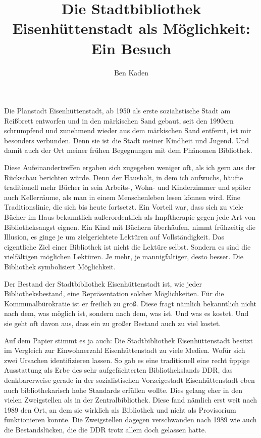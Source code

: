 \documentclass[a4paper,
fontsize=11pt,
oneside,
numbers=noperiodatend,
parskip=half-,
bibliography=totoc,
final
]{scrartcl}
\title{\LARGE{Die Stadtbibliothek Eisenhüttenstadt als Möglichkeit: Ein Besuch}} %
\author{Ben Kaden} %
\date{}
\begin{document}
\maketitle
\thispagestyle{fancyplain} 


Die Planstadt Eisenhüttenstadt, ab 1950 als erste sozialistische Stadt
am Reißbrett entworfen und in den märkischen Sand gebaut, seit den
1990ern schrumpfend und zunehmend wieder aus dem märkischen Sand
entfernt, ist mir besonders verbunden. Denn sie ist die Stadt meiner
Kindheit und Jugend. Und damit auch der Ort meiner frühen Begegnungen
mit dem Phänomen Bibliothek.

Diese Aufeinandertreffen ergaben sich zugegeben weniger oft, als ich
gern aus der Rückschau berichten würde. Denn der Haushalt, in dem ich
aufwuchs, häufte traditionell mehr Bücher in sein Arbeits-, Wohn- und
Kinderzimmer und später auch Kellerräume, als man in einem Menschenleben
lesen können wird. Eine Traditionslinie, die sich bis heute fortsetzt.
Ein Vorteil war, dass sich zu viele Bücher im Haus bekanntlich
außerordentlich als Impftherapie gegen jede Art von Bibliotheksangst
eignen. Ein Kind mit Büchern überhäufen, nimmt frühzeitig die Illusion,
es ginge je um zielgerichtete Lektüren auf Vollständigkeit. Das
eigentliche Ziel einer Bibliothek ist nicht die Lektüre selbst. Sondern
es sind die vielfältigen möglichen Lektüren. Je mehr, je mannigfaltiger,
desto besser. Die Bibliothek symbolisiert Möglichkeit.

Der Bestand der Stadtbibliothek Eisenhüttenstadt ist, wie jeder
Bibliotheksbestand, eine Repräsentation solcher Möglichkeiten. Für die
Kommunalbürokratie ist er freilich zu groß. Diese fragt nämlich
bekanntlich nicht nach dem, was möglich ist, sondern nach dem, was ist.
Und was es kostet. Und sie geht oft davon aus, dass ein zu großer
Bestand auch zu viel kostet.

Auf dem Papier stimmt es ja auch: Die Stadtbibliothek Eisenhüttenstadt
besitzt im Vergleich zur Einwohnerzahl Eisenhüttenstadt zu viele Medien.
Wofür sich zwei Ursachen identifizieren lassen. So gab es eine
traditionell eine recht üppige Ausstattung als Erbe des sehr
aufgefächterten Bibliothekslands DDR, das denkbarerweise gerade in der
sozialistischen Vorzeigestadt Eisenhüttenstadt eben auch
bibliothekarisch hohe Standards erfüllen wollte. Dies gelang eher in den
vielen Zweigstellen als in der Zentralbibliothek. Diese fand nämlich
erst weit nach 1989 den Ort, an dem sie wirklich als Bibliothek und
nicht als Provisorium funktionieren konnte. Die Zweigstellen dagegen
verschwanden nach 1989 wie auch die Bestandslücken, die die DDR trotz
allem doch gelassen hatte.
\end{document}

